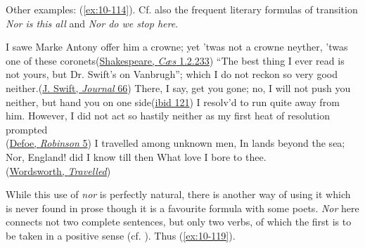 Other examples: (\ref{ex:10-114}). Cf. also the frequent literary formulas of transition \textit{Nor is this all} and \textit{Nor do we stop here}.

\ea \label{ex:10-114}
\ea
I sawe Marke Antony offer him a crowne; yet 'twas not a crowne neyther, 'twas one of these coronets\hfill(\href{https://internetshakespeare.uvic.ca/doc/JC_F1/scene/1.2/index.html#tln-335}{Shakespeare, \textit{Cæs} 1.2.233})
\ex
``The best thing I ever read is not yours, but Dr. Swift's on Vanbrugh''; which I do not reckon so very good neither.\hfill(\href{https://archive.org/details/journaltostellae00swifuoft/page/66/mode/2up?q=%22which+I+do+not+reckon+so+very+good%22&view=theater}{J. Swift, \textit{Journal} 66}) %
\ex
There, I say, get you gone; no, I will not push you neither, but hand you on one side\hfill(\href{https://archive.org/details/journaltostellae00swifuoft/page/120/mode/2up?q=%22will+not+push+you+neither%22&view=theater}{ibid 121})
\ex
I resolv'd to run quite away from him. However, I did not act so hastily neither as my first heat of resolution prompted\\\hfill(\href{https://archive.org/details/lifeandstranges00dobsgoog/page/n31/mode/2up?q=%22run+quite+away%22&view=theater}{Defoe, \textit{Robinson} 5}) 
\ex
I travelled among unknown men, In lands beyond the sea; Nor, England! did I know till then What love I bore to thee.\\\hfill(\href{https://archive.org/details/poemsofwilliamwo01word/page/78/mode/2up?q=%22What+love+I+bore+to+thee%22&view=theater}{Wordsworth, \textit{Travelled}})
\z
\z
{}

\label{another-way-of-using-it}While this use of \textit{nor} is perfectly natural, there is another way of using it which is never found in prose though it is a favourite formula with some poets. \textit{Nor} here connects not two complete sentences, but only two verbs, of which the first is to be taken in a positive sense (cf. \cite[\href{https://archive.org/details/tennysonssprache00dybouoft/page/2/mode/2up?view=theater}{2}]{dyboski1907tennysons}). Thus (\ref{ex:10-119}).

